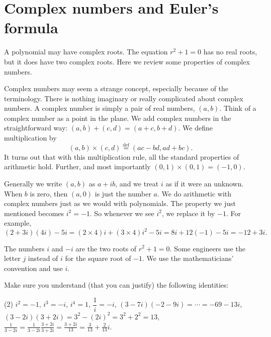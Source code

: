 \chapter{Complex numbers and Euler's formula}\label{complex:appendix}

A polynomial may have complex roots.  The
equation $r^2 + 1 = 0$ has no real roots, but it does have two complex roots.
Here we review some properties of complex numbers.

Complex numbers may seem a strange concept, especially because of the
terminology.  There is nothing imaginary or really complicated about complex
numbers.
A complex number is simply a pair of real numbers, $(a,b)$.  
Think of a complex number as a point in the plane.  We add complex numbers
in the straightforward way: $(a,b)+(c,d)=(a+c,b+d)$.  We define
multiplication by
\begin{equation*}
(a,b) \times (c,d) \overset{\text{def}}{=} (ac-bd,ad+bc) .
\end{equation*}
It turns out that with this multiplication rule, all the standard properties
of arithmetic hold.  Further, and most importantly $(0,1) \times (0,1) =
(-1,0)$.

Generally we write $(a,b)$ as $a+ib$, and we treat $i$ as if it were an
unknown.  When $b$ is zero, then $(a,0)$ is just the number $a$.
We do arithmetic with complex numbers just as we would
with polynomials.
The property we just mentioned becomes $i^2 = -1$.
So whenever we see $i^2$, we replace it by $-1$.
For example,
\begin{equation*}
(2+3i)(4i) - 5i = 
(2\times 4)i + (3 \times 4) i^2 - 5i
=
8i + 12 (-1) - 5i
=
-12 + 3i .
\end{equation*}

The numbers
$i$ and $-i$ are the two roots of $r^2 + 1 = 0$.
Some engineers use the letter $j$ instead of $i$ for the square
root of $-1$.  We use the mathematicians' convention and use $i$.

\begin{exercise}
Make sure you understand (that you can justify)
the following identities:
\begin{tasks}(2)
\task $i^2 = -1$, $i^3 = -i$, $i^4 = 1$,
\task $\dfrac{1}{i} = -i$,
\task $(3-7i)(-2-9i) = \cdots = -69-13i$,
\task $(3-2i)(3+2i) = 3^2 - {(2i)}^2 = 3^2 + 2^2 = 13$,
\task $\frac{1}{3-2i} = \frac{1}{3-2i} \frac{3+2i}{3+2i} = \frac{3+2i}{13}
= \frac{3}{13}+\frac{2}{13}i$.
\end{tasks}
\end{exercise}

